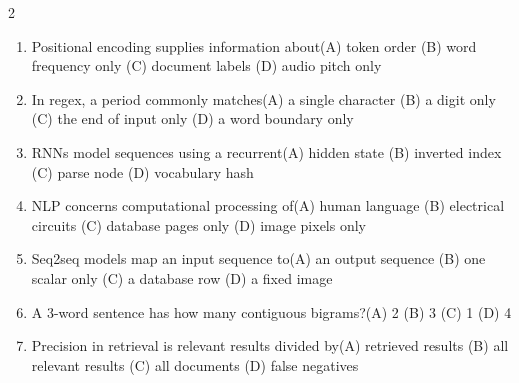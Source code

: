 \documentclass[a4paper]{article}
\begin{document}
\begin{multicols*}{2}
\begin{enumerate}[resume]
\item Positional encoding supplies information about\newline\hspace*{0.6em}(A) token order \quad (B) word frequency only \newline\hspace*{0.6em}(C) document labels \quad (D) audio pitch only
\item In regex, a period commonly matches\newline\hspace*{0.6em}(A) a single character \quad (B) a digit only \newline\hspace*{0.6em}(C) the end of input only \quad (D) a word boundary only
\item RNNs model sequences using a recurrent\newline\hspace*{0.6em}(A) hidden state \quad (B) inverted index \newline\hspace*{0.6em}(C) parse node \quad (D) vocabulary hash
\item NLP concerns computational processing of\newline\hspace*{0.6em}(A) human language \quad (B) electrical circuits \newline\hspace*{0.6em}(C) database pages only \quad (D) image pixels only
\item Seq2seq models map an input sequence to\newline\hspace*{0.6em}(A) an output sequence \quad (B) one scalar only \newline\hspace*{0.6em}(C) a database row \quad (D) a fixed image
\item A 3-word sentence has how many contiguous bigrams?\newline\hspace*{0.6em}(A) 2 \quad (B) 3 \newline\hspace*{0.6em}(C) 1 \quad (D) 4
\item Precision in retrieval is relevant results divided by\newline\hspace*{0.6em}(A) retrieved results \quad (B) all relevant results \newline\hspace*{0.6em}(C) all documents \quad (D) false negatives

\end{enumerate}
\end{multicols*}
\end{document}
